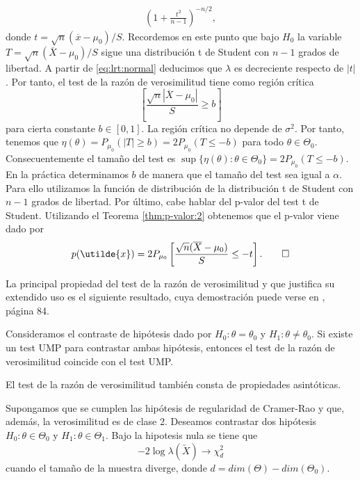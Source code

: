 \begin{ex}
\begin{equation}
\begin{split}
            \left(1 + \frac{t^2}{n-1}\right)^{-n/2},
            \end{split}
            \end{equation}
            donde $t = \sqrt{n}(\overline{x} - \mu_0) / S$. Recordemos en este punto que bajo $H_0$ la variable $T = \sqrt{n}(\overline{X} - \mu_0) / S$ sigue una distribución t de Student con $n-1$ grados de libertad. A partir de \eqref{eq:lrt:normal} deducimos que $\lambda$ es decreciente respecto de $|t|$. Por tanto, el test de la razón de verosimilitud tiene como región crítica
            \[\left[\frac{\sqrt{n}|\overline{X} - \mu_0|}{S} \ge b\right]\]
            para cierta constante $b \in [0,1]$. La región crítica no depende de $\sigma^2$. Por tanto, tenemos que $\eta(\theta) = P_{\mu_0}(|T| \ge b) = 2 P_{\mu_0}(T \le -b)$ para todo $\theta \in \Theta_0$. Consecuentemente el tamaño del test es $\sup\{\eta(\theta): \theta \in \Theta_0\} = 2P_{\mu_0}(T \le -b)$. En la práctica determinamos $b$ de manera que el tamaño del test sea igual a $\alpha$. Para ello utilizamos la función de distribución de la distribución t de Student con $n-1$ grados de libertad.
            Por último, cabe hablar del p-valor del test t de Student. Utilizando el Teorema \ref{thm:p-valor:2} obtenemos que el p-valor viene dado por
            \[p(\utilde{x}) = 2P_{\mu_0}\left[\frac{\sqrt{n}(\overline{X} - \mu_0)}{S} \le -t\right]. \qedhere\]
        \end{ex}

        La principal propiedad del test de la razón de verosimilitud y que justifica su extendido uso es el siguiente resultado, cuya demostración puede verse en \cite{garthwaite}, página 84.

        \begin{thm}
            Consideramos el contraste de hipótesis dado por $H_0: \theta = \theta_0$ y $H_1: \theta \ne \theta_0$. Si existe un test UMP para contrastar ambas hipótesis, entonces el test de la razón de verosimilitud coincide con el test UMP.
        \end{thm}

        El test de la razón de verosimilitud también consta de propiedades asintóticas.

        \begin{thm}
            Supongamos que se cumplen las hipótesis de regularidad de Cramer-Rao y que, además, la verosimilitud es de clase 2. Deseamos contrastar dos hipótesis $H_0: \theta \in \Theta_0$ y $H_1: \theta \in \Theta_1$. Bajo la hipotesis nula se tiene que
            \[-2 \log \lambda(\utilde{X}) \to \chi_d^2\]
            cuando el tamaño de la muestra diverge, donde $d = dim(\Theta) - dim(\Theta_0)$.
        \end{thm}

